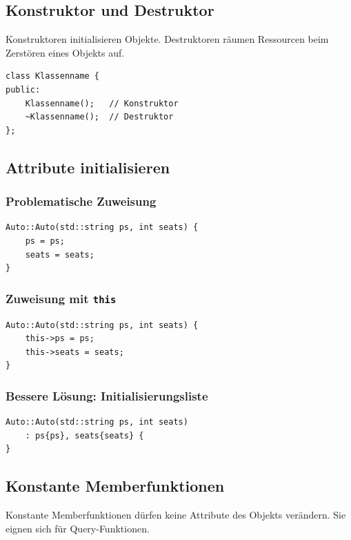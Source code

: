 \documentclass[11pt,a4paper]{article}
\newcommand{\code}[1]{\texttt{#1}}
\begin{document}
\subsection{Konstruktor und Destruktor}
Konstruktoren initialisieren Objekte. Destruktoren räumen Ressourcen beim Zerstören eines Objekts auf.

\begin{lstlisting}[caption={Konstruktor und Destruktor}]
class Klassenname {
public:
    Klassenname();   // Konstruktor
    ~Klassenname();  // Destruktor
};
\end{lstlisting}

\subsection{Attribute initialisieren}
\subsubsection{Problematische Zuweisung}
\begin{lstlisting}[caption={Unklare Initialisierung}]
Auto::Auto(std::string ps, int seats) {
    ps = ps;
    seats = seats;
}
\end{lstlisting}

\subsubsection{Zuweisung mit \code{this}}
\begin{lstlisting}[caption={Zuweisung mit this}]
Auto::Auto(std::string ps, int seats) {
    this->ps = ps;
    this->seats = seats;
}
\end{lstlisting}

\subsubsection{Bessere Lösung: Initialisierungsliste}
\begin{lstlisting}[caption={Initialisierungsliste}]
Auto::Auto(std::string ps, int seats)
    : ps{ps}, seats{seats} {
}
\end{lstlisting}

\subsection{Konstante Memberfunktionen}
Konstante Memberfunktionen dürfen keine Attribute des Objekts verändern. Sie eignen sich für Query-Funktionen.
\end{document}
